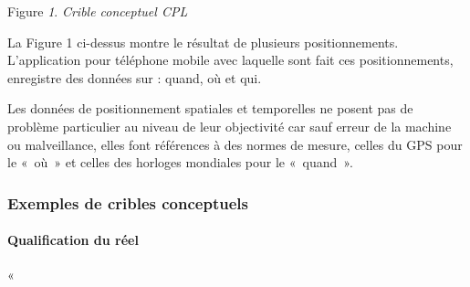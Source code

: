 \documentclass[
  letterpaper,
  DIV=11,
  numbers=noendperiod]{scrreprt}
\let\oldparagraph\paragraph
\renewcommand{\paragraph}[1]{\oldparagraph{#1}\mbox{}}
\begin{document}
\hfill\break
Figure \emph{1}. \emph{Crible conceptuel CPL}

La Figure 1 ci-dessus montre le résultat de plusieurs positionnements.
L'application pour téléphone mobile avec laquelle sont fait ces
positionnements, enregistre des données sur : quand, où et qui.

Les données de positionnement spatiales et temporelles ne posent pas de
problème particulier au niveau de leur objectivité car sauf erreur de la
machine ou malveillance, elles font références à des normes de mesure,
celles du GPS pour le «~où~» et celles des horloges mondiales pour le
«~quand~».

\hypertarget{exemples-de-cribles-conceptuels}{%
\subsubsection{Exemples de cribles
conceptuels}\label{exemples-de-cribles-conceptuels}}

\hypertarget{qualification-du-ruxe9el}{%
\paragraph{Qualification du réel}\label{qualification-du-ruxe9el}}

«~
\end{document}
